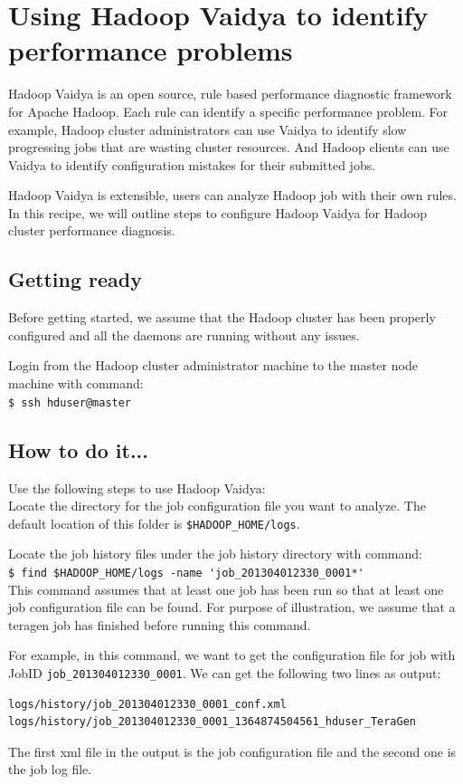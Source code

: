 \section{Using Hadoop Vaidya to identify performance problems}
Hadoop Vaidya is an open source, rule based performance diagnostic framework for Apache Hadoop. Each rule can identify a specific performance problem. For example, Hadoop cluster administrators can use Vaidya to identify slow progressing jobs that are wasting cluster resources. And Hadoop clients can use Vaidya to identify configuration mistakes for their submitted jobs.

Hadoop Vaidya is extensible, users can analyze Hadoop job with their own rules. In this recipe, we will outline steps to configure Hadoop Vaidya for Hadoop cluster performance diagnosis.

\subsection*{Getting ready}
Before getting started, we assume that the Hadoop cluster has been properly configured and all the daemons are running without any issues.

Login from the Hadoop cluster administrator machine to the master node machine with command:\\
\verb|$ ssh hduser@master|
\subsection*{How to do it...}
Use the following steps to use Hadoop Vaidya: \\
Locate the directory for the job configuration file you want to analyze. The default location of this folder is \verb|$HADOOP_HOME/logs|.

Locate the job history files under the job history directory with command:\\
\verb|$ find $HADOOP_HOME/logs -name 'job_201304012330_0001*'| \\

This command assumes that at least one job has been run so that at least one job configuration file can be found. For purpose of illustration, we assume that a teragen job has finished before running this command.

For example, in this command, we want to get the configuration file for job with JobID \verb|job_201304012330_0001|. We can get the following two lines as output:
\lstset{style=bashstyle}
\begin{lstlisting}
logs/history/job_201304012330_0001_conf.xml
logs/history/job_201304012330_0001_1364874504561_hduser_TeraGen
\end{lstlisting}
The first xml file in the output is the job configuration file and the second one is the job log file.

